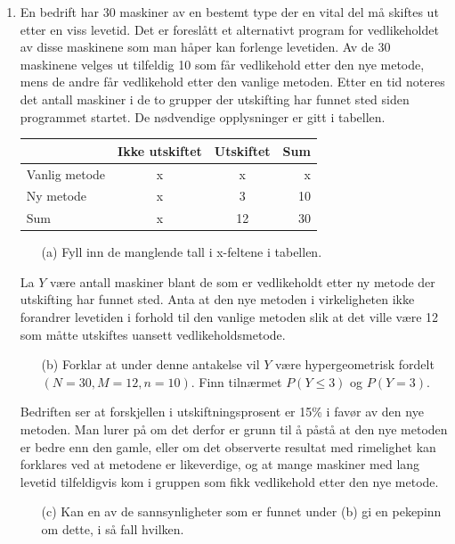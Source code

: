 \begin{enumerate}
\item  En bedrift har 30 maskiner av en bestemt type der en vital
     del må skiftes ut etter en viss levetid. Det er foreslått et
     alternativt program for vedlikeholdet av disse maskinene som
     man håper kan forlenge levetiden. Av de 30 maskinene velges
     ut tilfeldig 10 som får vedlikehold etter den nye metode,
     mens de andre får vedlikehold etter den vanlige metoden.
     Etter en tid noteres det antall maskiner i de to grupper der
     utskifting har funnet sted siden programmet startet. De
     nødvendige opplysninger er gitt i tabellen.
    \begin{center}
    \begin{tabular}{l|cc|r}  
                   & Ikke utskiftet & Utskiftet   & Sum \\ \hline
     Vanlig metode &      x         &     x       &  x  \\
     Ny metode     &      x         &     3       & 10   \\  \hline
     Sum           &      x         &    12       & 30 \\ \hline
    \end{tabular}
    \end{center} 
     \begin{itemize}
     \item[(a)]  Fyll inn de manglende tall i x-feltene i tabellen.
     \end{itemize}
     La $Y$ være antall maskiner blant de som er vedlikeholdt
     etter ny metode der utskifting har funnet sted. Anta at den
     nye metoden i virkeligheten ikke forandrer levetiden i
     forhold til den vanlige metoden slik at det ville være 12
     som måtte utskiftes uansett vedlikeholdsmetode.
     \begin{itemize}
     \item[(b)]  Forklar at under denne antakelse vil $Y$ være
          hypergeometrisk fordelt $(N=30, M=12, n=10)$. Finn
          tilnærmet $P(Y\leq 3)$ og $P(Y=3)$.
     \end{itemize}
     Bedriften ser at forskjellen i utskiftningsprosent er 15\% i
     favør av den nye metoden. Man lurer på om det derfor er
     grunn til å påstå at den nye metoden er bedre enn den gamle,
     eller om det observerte resultat med rimelighet kan
     forklares ved at metodene er likeverdige, og at mange
     maskiner med lang levetid tilfeldigvis kom i gruppen som
     fikk vedlikehold etter den nye metode.
     \begin{itemize}
     \item[(c)]  Kan en av de sannsynligheter som er funnet under (b) gi
          en pekepinn om dette, i så fall hvilken.
     \end{itemize}


\end{enumerate}
